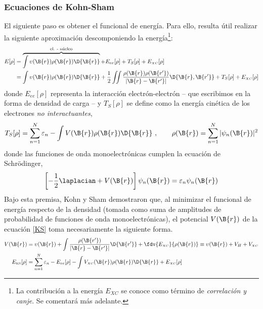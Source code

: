 \subsubsection{Ecuaciones de Kohn-Sham}
El siguiente paso es obtener el funcional de energía. Para ello, resulta útil realizar la siguiente aproximación descomponiendo la energía\footnote{La contribución a la energía $E_{\scriptscriptstyle XC}$ se conoce como término de \emph{correlación y canje}. Se comentará más adelante.}:
\begin{align}
    E[\rho] &= \overbrace{\int \upsilon(\B{r}) \rho(\B{r}) \D{\B{r}}}^{\text{el. - núcleo}} + E_{ee}[\rho] + T_S[\rho] + E_{\scriptscriptstyle XC}[\rho] \notag \\
            &= \int \upsilon(\B{r}) \rho(\B{r}) \D{\B{r}} + \frac{1}{2} \iint  \frac{\rho(\B{r}) \rho(\B{r'})}{|\B{r} - \B{r'}|} \D{\B{r},\B{r'}} + T_S[\rho] + E_{\scriptscriptstyle XC}[\rho]
\end{align}
donde $E_{ee}[\rho]$ representa la interacción electrón-electrón -- que escribimos en la forma de densidad de carga -- y $T_S[\rho]$ se define como la energía cinética de los electrones \emph{no interactuantes},
\begin{equation}
    T_S[\rho] = \sum_{n=1}^N \varepsilon_n - \int V(\B{r}) \rho(\B{r}) \D{\B{r}} \ , \qquad \rho(\B{r}) = \sum_{n=1}^N |\psi_n(\B{r})|^2
\end{equation}
donde las funciones de onda monoelectrónicas cumplen la ecuación de Schrödinger, 
\begin{equation} \label{KS}
    \left [ -\frac{1}{2}\laplacian + V(\B{r}) \right ] \psi_n(\B{r}) = \varepsilon_n \psi_n (\B{r})
\end{equation}
Bajo esta premisa, Kohn y Sham demostraron que, al minimizar el funcional de energía respecto de la densidad (tomada como suma de amplitudes de probabilidad de funciones de onda monoelectrónicas), el potencial $V(\B{r})$ de la ecuación \ref{KS} toma necesariamente la siguiente forma.
\begin{align}
    V(\B{r}) &= \upsilon (\B{r}) + \int \frac{\rho(\B{r'})}{|\B{r} - \B{r'}|} \D{\B{r'}} + \fdv{E_{\scriptscriptstyle XC}}{\rho(\B{r})} \equiv \upsilon(\B{r}) + V_H  + V_{\scriptscriptstyle XC} \\
    E_\text{\tiny   KS} [\rho] &= \sum_{n=1}^N \varepsilon_n - E_{ee}[\rho] - \int V_{\scriptscriptstyle XC}(\B{r}) \rho (\B{r}) \D{\B{r}} + E_{\scriptscriptstyle XC} [\rho] \label{func_KS}
\end{align}
